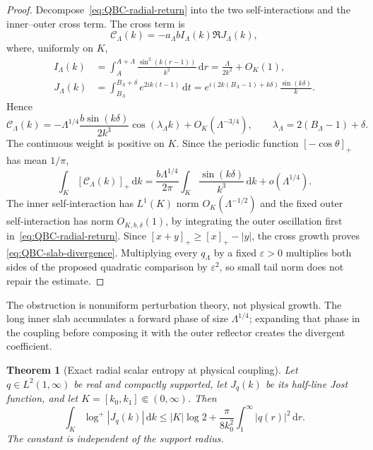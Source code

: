 \documentclass[11pt]{article}
\newcommand{\dd}{\,\mathrm d}
\newtheorem{theorem}{Theorem}[section]
\theoremstyle{definition}
\theoremstyle{remark}
\begin{document}
\begin{proof}
Decompose~\eqref{eq:QBC-radial-return} into the two self-interactions and the
inner--outer cross term.  The cross term is
\begin{equation}
 \mathcal C_\Lambda(k)
 =-a_\Lambda b I_\Lambda(k)\Re J_\Lambda(k),
\end{equation}
where, uniformly on $K$,
\begin{align}
 I_\Lambda(k)
 &=\int_A^{A+\Lambda}\frac{\sin^2(k(r-1))}{k^2}\dd r
 =\frac{\Lambda}{2k^2}+O_K(1),\\
 J_\Lambda(k)
 &=\int_{B_\Lambda}^{B_\Lambda+\delta}e^{2ik(t-1)}\dd t
 =e^{i(2k(B_\Lambda-1)+k\delta)}\frac{\sin(k\delta)}{k}.
\end{align}
Hence
\begin{equation}
 \mathcal C_\Lambda(k)
 =-\Lambda^{1/4}\frac{b\sin(k\delta)}{2k^3}
   \cos(\lambda_\Lambda k)+O_K(\Lambda^{-3/4}),
 \qquad
 \lambda_\Lambda=2(B_\Lambda-1)+\delta.
\end{equation}
The continuous weight is positive on $K$.  Since the periodic function
$[-\cos\theta]_+$ has mean $1/\pi$,
\begin{equation}
 \int_K[\mathcal C_\Lambda(k)]_+\dd k
 =\frac{b\Lambda^{1/4}}{2\pi}
   \int_K\frac{\sin(k\delta)}{k^3}\dd k+o(\Lambda^{1/4}).
\end{equation}
The inner self-interaction has $L^1(K)$ norm $O_K(\Lambda^{-1/2})$ and the
fixed outer self-interaction has norm $O_{K,b,\delta}(1)$, by integrating the
outer oscillation first in~\eqref{eq:QBC-radial-return}.  Since
$[x+y]_+\geq[x]_+-|y|$, the cross growth proves
\eqref{eq:QBC-slab-divergence}.  Multiplying every $q_\Lambda$ by a fixed
$\varepsilon>0$ multiplies both sides of the proposed quadratic comparison by
$\varepsilon^2$, so small tail norm does not repair the estimate.
\end{proof}

The obstruction is nonuniform perturbation theory, not physical growth.  The
long inner slab accumulates a forward phase of size $\Lambda^{1/4}$; expanding
that phase in the coupling before composing it with the outer reflector creates
the divergent coefficient.

\begin{theorem}[Exact radial scalar entropy at physical coupling]
\label{thm:scalar-physical-entropy}
Let $q\in L^2(1,\infty)$ be real and compactly supported, let $J_q(k)$ be its
half-line Jost function, and let $K=[k_0,k_1]\Subset(0,\infty)$.  Then
\begin{equation}
 \int_K\log^+|J_q(k)|\dd k
 \leq |K|\log2+\frac{\pi}{8k_0^2}
 \int_1^\infty|q(r)|^2\dd r.
 \label{eq:scalar-physical-entropy}
\end{equation}
The constant is independent of the support radius.
\end{theorem}
\end{document}
